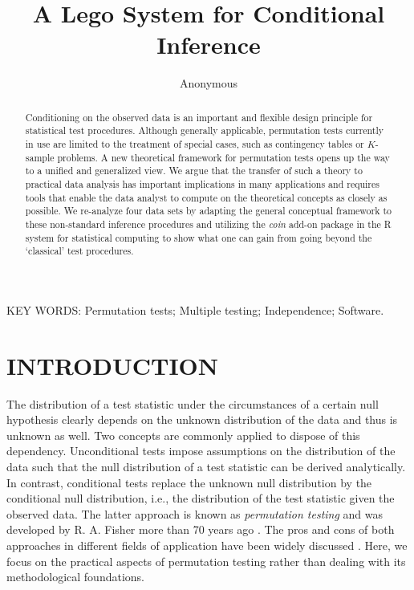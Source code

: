 \documentclass{article}
\newcommand{\Rpackage}[1]{\textit{#1}}
\newcommand{\RR}{\textsf{R}}
\begin{document}
\title{A Lego System for Conditional Inference}

\author{Anonymous}

\date{}

\maketitle

\thispagestyle{empty}


\begin{abstract}
Conditioning on the observed data is an important and flexible 
design principle for statistical test procedures. Although generally
applicable, permutation tests currently in use are limited to 
the treatment of special cases, such as contingency tables or $K$-sample
problems. A new theoretical framework for permutation
tests opens up the way to a unified and generalized view. We argue that the
transfer of such a theory to practical data analysis has important
implications in many applications and requires tools that enable the
data analyst to compute on the theoretical concepts as closely as possible.
We re-analyze four data sets
by adapting the general conceptual framework to these non-standard inference procedures
and
utilizing the \Rpackage{coin} add-on package in the \RR{} system for statistical computing
to show what one can gain from going beyond the `classical' test procedures.
\end{abstract}

\noindent
KEY WORDS: Permutation tests; Multiple testing; Independence; Software.
\newline


\newpage

\section{INTRODUCTION}

The distribution of a test statistic under the circumstances of a certain
null hypothesis clearly depends on the unknown distribution of the data and
thus is unknown as well.
Two concepts are commonly applied to dispose of this dependency.
Unconditional tests impose assumptions on the distribution of the data such
that the null distribution of a test statistic can be derived analytically. In contrast, 
conditional tests
replace the unknown null distribution by the conditional null distribution,
i.e., the distribution of the test statistic given the observed data. The
latter approach is known as \textit{permutation testing} and was developed
by R. A. Fisher more than 70 years ago \citep{Fisher1935}. 
The pros and cons of both approaches in different fields of application 
have been widely discussed \citep[e.g.~by][]{why-permut:1998,pros-and-c:2000,Shuster2005}.
Here, we focus on the practical aspects of permutation testing rather than
dealing with its methodological foundations.
\end{document}

